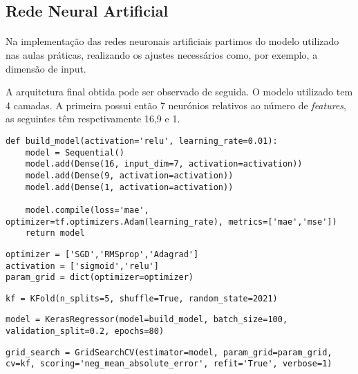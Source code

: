 \subsection{Rede Neural Artificial}
\paragraph{}
Na implementação das redes neuronais artificiais partimos do modelo utilizado nas aulas práticas, realizando os ajustes necessários como, por exemplo, a dimensão de input.

A arquitetura final obtida pode ser observado de seguida. O modelo utilizado tem 4 camadas. A primeira possui então 7 neurónios relativos ao número de \textit{features}, as seguintes têm respetivamente 16,9 e 1.

\begin{verbatim}
def build_model(activation='relu', learning_rate=0.01):
    model = Sequential()
    model.add(Dense(16, input_dim=7, activation=activation))
    model.add(Dense(9, activation=activation))
    model.add(Dense(1, activation=activation))
    
    model.compile(loss='mae', optimizer=tf.optimizers.Adam(learning_rate), metrics=['mae','mse'])
    return model
\end{verbatim}

\begin{verbatim}
optimizer = ['SGD','RMSprop','Adagrad']
activation = ['sigmoid','relu']
param_grid = dict(optimizer=optimizer)
\end{verbatim}

\begin{verbatim}
kf = KFold(n_splits=5, shuffle=True, random_state=2021)
\end{verbatim}

\begin{verbatim}
model = KerasRegressor(model=build_model, batch_size=100, validation_split=0.2, epochs=80)
\end{verbatim}

\begin{verbatim}
grid_search = GridSearchCV(estimator=model, param_grid=param_grid, cv=kf, scoring='neg_mean_absolute_error', refit='True', verbose=1)
\end{verbatim}

